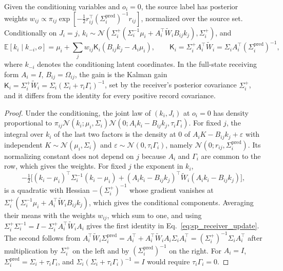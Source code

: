 \begin{proposition}\label{prop:sp_receiver_update}
Given the conditioning variables and $o_i=0$, the source label has posterior weights $w_{ij}\propto\pi_{ij}\exp[-\tfrac12r_{ij}^\top(\Sigma_i^{\mathrm{pred}})^{-1}r_{ij}]$, normalized over the source set. Conditionally on $J_i=j$, $k_i\sim\mathcal N(\Sigma_i^+(\Sigma_i^{-1}\mu_i+A_i^\top\widetilde W_iB_{ij}k_j),\Sigma_i^+)$, and
\begin{equation}
\mathbb E[k_i\mid k_{-i},o]=\mu_i+\sum_jw_{ij}\mathsf K_i(B_{ij}k_j-A_i\mu_i),
\qquad
\mathsf K_i=\Sigma_i^+A_i^\top\widetilde W_i=\Sigma_iA_i^\top(\Sigma_i^{\mathrm{pred}})^{-1},
\label{eq:sp_receiver_update}
\end{equation}
where $k_{-i}$ denotes the conditioning latent coordinates. In the full-state receiving form $A_i=I$, $B_{ij}=\Omega_{ij}$, the gain is the Kalman gain $\mathsf K_i=\Sigma_i^+\widetilde W_i=\Sigma_i(\Sigma_i+\tau_i\Gamma_i)^{-1}$, set by the receiver's posterior covariance $\Sigma_i^+$, and it differs from the identity for every positive record covariance.
\end{proposition}
\begin{proof}
Under the conditioning, the joint law of $(k_i,J_i)$ at $o_i=0$ has density proportional to $\pi_{ij}\mathcal N(k_i;\mu_i,\Sigma_i)\mathcal N(0;A_ik_i-B_{ij}k_j,\tau_i\Gamma_i)$. For fixed $j$, the integral over $k_i$ of the last two factors is the density at $0$ of $A_iK-B_{ij}k_j+\varepsilon$ with independent $K\sim\mathcal N(\mu_i,\Sigma_i)$ and $\varepsilon\sim\mathcal N(0,\tau_i\Gamma_i)$, namely $\mathcal N(0;r_{ij},\Sigma_i^{\mathrm{pred}})$. Its normalizing constant does not depend on $j$ because $A_i$ and $\Gamma_i$ are common to the row, which gives the weights. For fixed $j$ the exponent in $k_i$,
\begin{equation*}
-\tfrac12\big[(k_i-\mu_i)^\top\Sigma_i^{-1}(k_i-\mu_i)+(A_ik_i-B_{ij}k_j)^\top\widetilde W_i(A_ik_i-B_{ij}k_j)\big],
\end{equation*}
is a quadratic with Hessian $-(\Sigma_i^+)^{-1}$ whose gradient vanishes at $\Sigma_i^+(\Sigma_i^{-1}\mu_i+A_i^\top\widetilde W_iB_{ij}k_j)$, which gives the conditional components. Averaging their means with the weights $w_{ij}$, which sum to one, and using $\Sigma_i^+\Sigma_i^{-1}=I-\Sigma_i^+A_i^\top\widetilde W_iA_i$ gives the first identity in Eq.~\eqref{eq:sp_receiver_update}. The second follows from $A_i^\top\widetilde W_i\Sigma_i^{\mathrm{pred}}=A_i^\top+A_i^\top\widetilde W_iA_i\Sigma_iA_i^\top=(\Sigma_i^+)^{-1}\Sigma_iA_i^\top$ after multiplication by $\Sigma_i^+$ on the left and by $(\Sigma_i^{\mathrm{pred}})^{-1}$ on the right. For $A_i=I$, $\Sigma_i^{\mathrm{pred}}=\Sigma_i+\tau_i\Gamma_i$, and $\Sigma_i(\Sigma_i+\tau_i\Gamma_i)^{-1}=I$ would require $\tau_i\Gamma_i=0$.
\end{proof}

